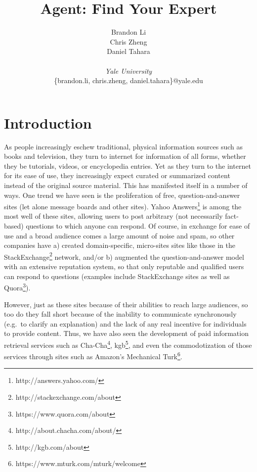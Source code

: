 

\title{Agent: Find Your Expert}
\author{
  Brandon Li\\
  Chris Zheng \\
  Daniel Tahara\\ \\
  {\it Yale University}\\
  \{brandon.li, chris.zheng, daniel.tahara\}@yale.edu
}
\renewcommand{\today}{}
\maketitle

\section{Introduction}
\label{sec:intro}
As people increasingly eschew traditional, physical information sources such as
books and television, they turn to internet for information of all forms,
whether they be tutorials, videos, or encyclopedia entries. Yet as they turn to
the internet for its ease of use, they increasingly expect curated or summarized
content instead of the original source material. This has manifested itself in a
number of ways. One trend we have seen is the proliferation of free,
question-and-answer sites (let alone message boards and other sites).  Yahoo
Answers\footnote{http://answers.yahoo.com/} is among the most well of these
sites, allowing users to post arbitrary (not necessarily fact-based) questions
to which anyone can respond. Of course, in exchange for ease of use and a broad
audience comes a large amount of noise and spam, so other companies have a)
created domain-specific, micro-sites sites like those in the
StackExchange\footnote{http://stackexchange.com/about} network, and/or b)
augmented the question-and-answer model with an extensive reputation system, so
that only reputable and qualified users can respond to questions (examples
include StackExchange sites as well as
Quora\footnote{https://www.quora.com/about}).

However, just as these sites because of their abilities to reach large
audiences, so too do they fall short because of the inability to communicate
synchronously (e.g.\ to clarify an explanation) and the lack of any real
incentive for individuals to provide content. Thus, we have also seen the
development of paid information retrieval services such as
Cha-Cha\footnote{http://about.chacha.com/about/},
kgb\footnote{http://kgb.com/about}, and even the commodotization of those
services through sites such as Amazon's Mechanical
Turk\footnote{https://www.mturk.com/mturk/welcome}.

